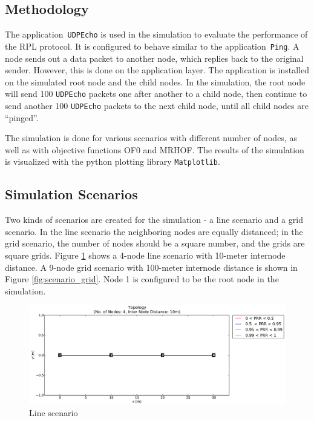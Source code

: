 \subsection{Methodology}
\label{Sim:Method}
The application~\texttt{UDPEcho} is used in the simulation to evaluate the performance of the RPL protocol. It is configured to behave similar to the application~\texttt{Ping}. A node sends out a data packet to another node, which replies back to the original sender. However, this is done on the application layer. The application is installed on the simulated root node and the child nodes. In the simulation, the root node will send 100 \texttt{UDPEcho} packets one after another to a child node, then continue to send another 100 \texttt{UDPEcho} packets to the next child node, until all child nodes are  ``pinged''.     

The simulation is done for various scenarios with different number of nodes, as well as with objective functions OF0 and MRHOF. The results of the simulation is visualized with the python plotting library \texttt{Matplotlib}.

\subsection{Simulation Scenarios}
\label{Sim:Scenarios}

Two kinds of scenarios are created for the simulation - a line scenario and a grid scenario. In the line scenario the neighboring nodes are equally distanced; in the grid scenario, the number of nodes should be a square number, and the grids are square grids. Figure \ref{fig:scenario_line} shows a 4-node line scenario with 10-meter internode distance. A 9-node grid scenario with 100-meter internode distance is shown in Figure \ref{fig:scenario_grid}. Node 1 is configured to be the root node in the simulation.

\begin{figure}[htpb]
 	\centering
    \leavevmode
      \includegraphics[scale=0.35]{Pics/results/topo4_dist10_line.pdf}
    \caption{Line scenario}
    \label{fig:scenario_line}
\end{figure}

